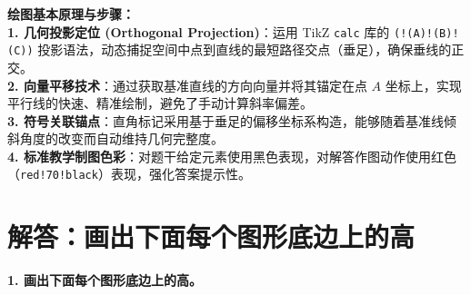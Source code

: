 \vspace{0.6cm}

{\small\color{blue!70!black}
\textbf{绘图基本原理与步骤：}\\
\textbf{1. 几何投影定位 (Orthogonal Projection)}：运用 TikZ \texttt{calc} 库的 \texttt{(!(A)!(B)!(C))} 投影语法，动态捕捉空间中点到直线的最短路径交点（垂足），确保垂线的正交。\\
\textbf{2. 向量平移技术}：通过获取基准直线的方向向量并将其锚定在点 $A$ 坐标上，实现平行线的快速、精准绘制，避免了手动计算斜率偏差。\\
\textbf{3. 符号关联锚点}：直角标记采用基于垂足的偏移坐标系构造，能够随着基准线倾斜角度的改变而自动维持几何完整度。\\
\textbf{4. 标准教学制图色彩}：对题干给定元素使用黑色表现，对解答作图动作使用红色（\texttt{red!70!black}）表现，强化答案提示性。
}

\vspace{0.8cm}

\newpage


\section{解答：画出下面每个图形底边上的高}

\vspace{0.4cm}

\noindent\textbf{1. 画出下面每个图形底边上的高。}

\vspace{1.2cm}

